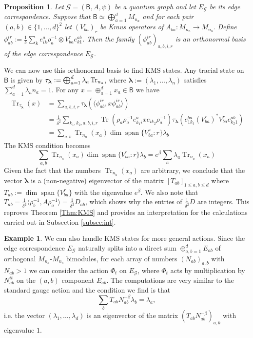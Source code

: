 \documentclass[a4paper,reqno]{amsart}
\numberwithin{equation}{section}
\numberwithin{theorem}{section}
\newtheorem{proposition}[theorem]{Proposition}
\theoremstyle{definition}\newtheorem{definition}[theorem]{Definition}
\theoremstyle{definition}\newtheorem{remark}[theorem]{Remark}
\theoremstyle{definition}\newtheorem{example}[theorem]{Example}
\theoremstyle{definition}\newtheorem*{notation*}{Notation}
\theoremstyle{definition}\newtheorem*{convention*}{Convention}
\theoremstyle{definition}\newtheorem{observation}{Observation}
\theoremstyle{definition}\newtheorem*{acknowledgment*}{Acknowledgments}
\newcommand{\B}{\mathsf{B}}
\newcommand{\G}{\mathcal{G}}
\renewcommand{\op}[1]{\operatorname{#1}}
\begin{document}
\begin{proposition}
Let $\G=(\B, A, \psi)$ be a quantum graph and let $E_{\G}$ be its edge correspondence. Suppose that $\B\simeq \bigoplus_{a=1}^{d} M_{n_{a}}$ and for each pair $(a,b) \in \{1,\ldots,d\}^2$ let $(V_{ba}^{r})_{r}$ be Kraus operators of $A_{ba}: M_{n_{a}} \to M_{n_b}$. Define $\phi_{ab}^{ir}:= \frac{1}{\delta}\sum_{k} e_{ik}^{a} \rho_{a}^{-1}\otimes V_{ba}^{r}e_{k1}^{ab}$. Then the family $(\phi_{ab}^{ir})_{a,b,i,r}$ is an orthonormal basis of the edge correspondence $E_{\G}$. 
\end{proposition}

We can now use this orthonormal basis to find KMS states. Any tracial state on $\B$ is given by $\tau_{\bm{\lambda}}:= \bigoplus_{a=1}^{d} \lambda_{a} \Tr_{n_a}$, where $\bm{\lambda}:= (\lambda_1, \dots, \lambda_n)$ satisfies $\sum_{a=1}^d \lambda_a n_a = 1$. For any $x=\oplus_{a=1}^d x_a\in\B$  we have 
\begin{align*}
\op{Tr}_{\tau_{\bm{\lambda}}}(x) &= \sum_{a,b,i,r}\tau_{\bm{\lambda}} (\langle \phi_{ab}^{ir}, x\phi_{ab}^{ir}\rangle) \\
&= \frac{1}{\delta^2} \sum_{k_1, k_2, a, b, i, r} \op{Tr}(\rho_{a} \rho_{a}^{-1} e_{k_1 i}^{a} x e_{i k_2} \rho_{a}^{-1})\tau_{\bm{\lambda}} (e_{1 k_1}^{ba} (V_{ba}^{r})^{\ast} V_{ba}^{r} e_{k_2 1}^{ab}) \\
&= \sum_{a,b} \op{Tr}_{n_a}(x_{a}) \op{dim}\op{span}\{V_{ba}^{r}: r\} \lambda_b
\end{align*}
The KMS condition becomes
\[
\sum_{a,b} \op{Tr}_{n_a}(x_{a}) \op{dim}\op{span}\{V_{ba}^{r}:r\} \lambda_b = e^{\beta} \sum_{a} \lambda_{a} \op{Tr}_{n_a}(x_{a})
\]
Given the fact that the numbers $\op{Tr}_{n_{a}} (x_{a})$ are arbitrary, we conclude that the vector $\bm{\lambda}$ is a (non-negative) eigenvector of the matrix $[T_{ab}]_{1\leq a,b\leq d}$ where $T_{ab}:= \op{dim}\op{span}\{V_{ba}^{r}\}$ with the eigenvalue $e^{\beta}$. We also note that $T_{ab} = \frac{1}{\delta^2} \langle \rho_{b}^{-1}, A\rho_{a}^{-1}\rangle = \frac{1}{\delta^2} D_{ab}$, which shows why the entries of $\frac{1}{\delta^2} D$ are integers. This reproves Theorem \ref{Thm:KMS} and provides an interpretation for the calculations carried out in Subsection \ref{subsec:int}.

\begin{example}
We can also handle KMS states for more general actions. Since the edge correspondence $E_{\G}$ naturally splits into a direct sum $\oplus_{a,b=1}^d E_{ab}$ of orthogonal $M_{n_a}$-$M_{n_b}$ bimodules, for each array of numbers $(N_{ab})_{a,b}$ with $N_{ab}>1$ we can consider the action $\Phi_t$ on $E_{\G}$, where $\Phi_t$ acts by multiplication by $N_{ab}^{it}$ on the $(a,b)$ component $E_{ab}$. The computations are very similar to the standard gauge action and the condition we find is that
\[
\sum_{b} T_{ab} N_{ab}^{-\beta}\lambda_{b} = \lambda_{a},
\]
i.e. the vector $(\lambda_{1},\dots, \lambda_d)$ is an eigenvector of the matrix $(T_{ab} N_{ab}^{-\beta})_{a,b}$ with eigenvalue $1$.

\end{example}
\end{document}
